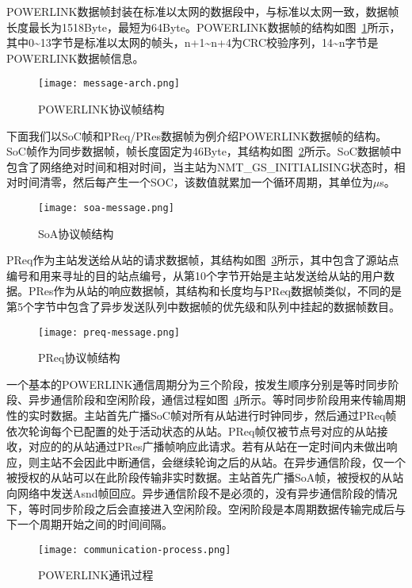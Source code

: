 POWERLINK数据帧封装在标准以太网的数据段中，与标准以太网一致，数据帧长度最长为1518Byte，最短为64Byte。POWERLINK数据帧的结构如图~\ref{fig:message-arch}所示，其中0\textasciitilde13字节是标准以太网的帧头，n+1\textasciitilde n+4为CRC校验序列，14\textasciitilde n字节是POWERLINK数据帧信息。

\begin{figure}[!htb]
  \centering
  \texttt{[image: message-arch.png]}
  \caption{POWERLINK协议帧结构}
  \label{fig:message-arch}
\end{figure}

下面我们以SoC帧和PReq/PRes数据帧为例介绍POWERLINK数据帧的结构。SoC帧作为同步数据帧，帧长度固定为46Byte，其结构如图~\ref{fig:soa-message}所示。SoC数据帧中包含了网络绝对时间和相对时间，当主站为NMT\_GS\_INITIALISING状态时，相对时间清零，然后每产生一个SOC，该数值就累加一个循环周期，其单位为$\mu$s。

\begin{figure}[!htb]
  \centering
  \texttt{[image: soa-message.png]}
  \caption{SoA协议帧结构}
  \label{fig:soa-message}
\end{figure}

PReq作为主站发送给从站的请求数据帧，其结构如图~\ref{fig:preq-message}所示，其中包含了源站点编号和用来寻址的目的站点编号，从第10个字节开始是主站发送给从站的用户数据。PRes作为从站的响应数据帧，其结构和长度均与PReq数据帧类似，不同的是第5个字节中包含了异步发送队列中数据帧的优先级和队列中挂起的数据帧数目。

\begin{figure}[!htb]
  \centering
  \texttt{[image: preq-message.png]}
  \caption{PReq协议帧结构}
  \label{fig:preq-message}
\end{figure}

一个基本的POWERLINK通信周期分为三个阶段，按发生顺序分别是等时同步阶段、异步通信阶段和空闲阶段，通信过程如图~\ref{fig:communication-process}所示。等时同步阶段用来传输周期性的实时数据。主站首先广播SoC帧对所有从站进行时钟同步，然后通过PReq帧依次轮询每个已配置的处于活动状态的从站。PReq帧仅被节点号对应的从站接收，对应的的从站通过PRes广播帧响应此请求。若有从站在一定时间内未做出响应，则主站不会因此中断通信，会继续轮询之后的从站。在异步通信阶段，仅一个被授权的从站可以在此阶段传输非实时数据。主站首先广播SoA帧，被授权的从站向网络中发送Asnd帧回应。异步通信阶段不是必须的，没有异步通信阶段的情况下，等时同步阶段之后会直接进入空闲阶段。空闲阶段是本周期数据传输完成后与下一个周期开始之间的时间间隔。

\begin{figure}[!htb]
  \centering
  \texttt{[image: communication-process.png]}
  \caption{POWERLINK通讯过程}
  \label{fig:communication-process}
\end{figure}

